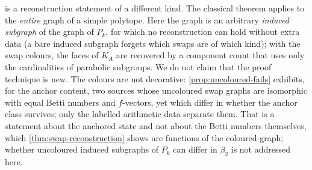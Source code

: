  is a reconstruction statement of a different kind. The classical theorem applies to the \emph{entire} graph of a simple polytope. Here the graph is an arbitrary \emph{induced subgraph} of the graph of $P_k$, for which no reconstruction can hold without extra data (a bare induced subgraph forgets which swaps are of which kind); with the swap colours, the faces of $K_A$ are recovered by a component count that uses only the cardinalities of parabolic subgroups. We do not claim that the proof technique is new. The colours are not decorative: \cref{prop:uncoloured-fails} exhibits, for the anchor content, two sources whose uncoloured swap graphs are isomorphic with equal Betti numbers and $f$-vectors, yet which differ in whether the anchor class survives; only the labelled arithmetic data separate them. That is a statement about the anchored state and not about the Betti numbers themselves, which \cref{thm:swap-reconstruction} shows are functions of the coloured graph; whether uncoloured induced subgraphs of $P_k$ can differ in $\beta_2$ is not addressed here.

